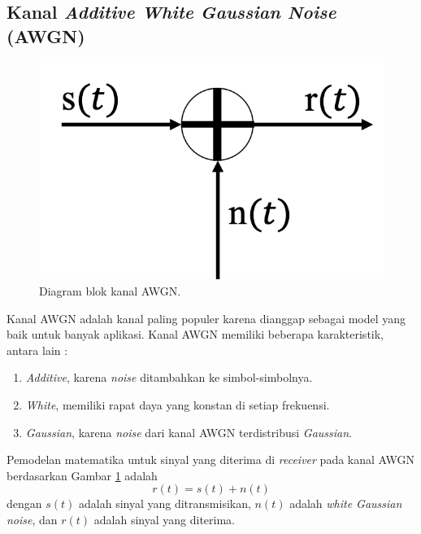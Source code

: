 \subsection{Kanal \textit{Additive White Gaussian Noise} (AWGN)}
\begin{figure}[tp]
	\centering
	\includegraphics[scale=0.55]
		{pics/awgn1.png}
		\caption{Diagram blok kanal AWGN.}
	\label{fig:Model Channel Model AWGN}
\end{figure}
Kanal AWGN adalah kanal paling populer karena dianggap sebagai model yang baik untuk banyak aplikasi. Kanal AWGN memiliki beberapa karakteristik, antara lain \cite{awgn1}: 
\begin{enumerate}
\item \textit{Additive}, karena \textit{noise} ditambahkan ke simbol-simbolnya.
\item \textit{White}, memiliki rapat daya yang konstan di setiap frekuensi.
\item \textit{Gaussian}, karena \textit{noise} dari kanal AWGN terdistribusi \textit{Gaussian}.
\end{enumerate}
Pemodelan matematika untuk sinyal yang diterima di \textit{receiver} pada kanal AWGN berdasarkan Gambar \ref{fig:Model Channel Model AWGN} adalah 
\begin{equation}
r(t)=s(t)+n(t)
\label{eq:Model Matematika Channel Model AWGN}
\end{equation}
dengan $s(t)$ adalah sinyal yang ditransmisikan, $n(t)$ adalah \textit{white Gaussian noise}, dan $r(t)$ adalah sinyal yang diterima.

